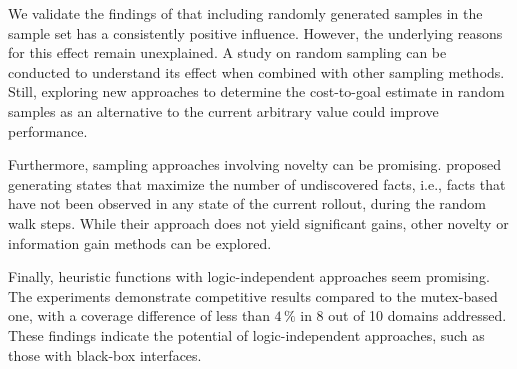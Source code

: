 We validate the findings of \citet{otoole2022sampling} that including randomly generated samples in the sample set has a consistently positive influence. However, the underlying reasons for this effect remain unexplained. A study on random sampling can be conducted to understand its effect when combined with other sampling methods. Still, exploring new approaches to determine the cost-to-goal estimate in random samples as an alternative to the current arbitrary value could improve performance.

Furthermore, sampling approaches involving novelty can be promising. \citet{otoole2022sampling} proposed generating states that maximize the number of undiscovered facts, i.e., facts that have not been observed in any state of the current rollout, during the random walk steps. While their approach does not yield significant gains, other novelty or information gain methods can be explored.

Finally, heuristic functions with logic-independent approaches seem promising. The experiments demonstrate competitive results compared to the mutex-based one, with a coverage difference of less than $4\,\%$ in 8 out of 10 domains addressed. These findings indicate the potential of logic-independent approaches, such as those with black-box interfaces.
